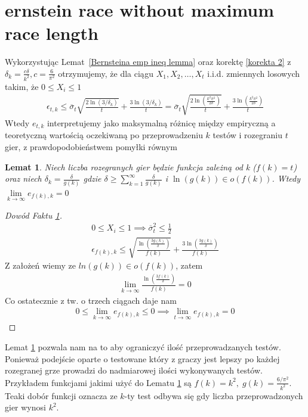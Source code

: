 \documentclass[inzynierska]{pwr_wmat_praca_dyplomowa}
\theoremstyle{plain}
\numberwithin{theorem}{chapter}
\newtheorem{lemma}[theorem]{Lemat}
\theoremstyle{definition}
\numberwithin{theorem}{chapter}
\begin{document}
	\section{ernstein race without maximum race length}
	Wykorzystując Lemat~\ref{Bernsteina emp ineq lemma} oraz korektę \ref{korekta 2} z $\delta_k=\frac{c\delta}{k^2}, c=\frac{6}{\pi^2}$ otrzymujemy, że dla ciągu $X_1,X_2,\dots,X_t$ i.i.d. zmiennych losowych takim, że  $0 \le X_i \le 1$ 
	\begin{align*}
		\label{Bernstein race without maximum race length}
		\epsilon_{t,k} \le \overline{\sigma}_t \sqrt{\frac{2\ln(3/\delta_k)}{t}} + \frac{3  \ln{(3 / \delta_k)}}{t} =
		\overline{\sigma}_t\sqrt{\frac{2\ln(\frac{k^2\pi^2}{2\delta})}{t}} + \frac{3  \ln{(\frac{k^2\pi^2}{2\delta})}}{t}
	\end{align*}
	Wtedy $e_{t,k}$ interpretujemy jako maksymalną różnicę między empiryczną a teoretyczną wartością oczekiwaną po przeprowadzeniu $k$ testów i rozegraniu $t$ gier, z prawdopodobieństwem pomyłki równym 
	\begin{lemma}
		\label{lemma Bernstein race without maximum race length}
		Niech liczba rozegranych gier będzie funkcja zależną od k ($f(k) = t$) oraz niech $\delta_k = \frac{\delta}{g(k)}$
		gdzie $\delta \ge \sum_{k=1}^{\infty} \frac{\delta}{g(k)}$ i $\ln(g(k)) \in o(f(k))$. Wtedy
		$\lim\limits_{k\to\infty} e_{f(k),k} = 0$ 
	\end{lemma}
	\begin{proof}[Dowód Faktu \ref{lemma Bernstein race without maximum race length}]
		\begin{gather*}
			0\le X_i \le 1 \implies \overline{\sigma}_t^2 \le \frac{1}{2}\\
			\epsilon_{f(k), k} \le  \sqrt{\frac{\ln(\frac{3g(k)}{\delta})}{f(k)}} + \frac{3  \ln{(\frac{3g(k)}{\delta})}}{f(k)}
		\end{gather*}
		Z założeń wiemy ze $ln(g(k)) \in o(f(k))$, zatem
		\begin{gather*}
			\lim\limits_{k\to\infty} \frac{  \ln{(\frac{3f(k)}{\delta})}}{f(k)} = 0
		\end{gather*}
		Co ostatecznie z tw. o trzech ciągach daje nam
		\begin{gather*}
			0\le \lim\limits_{k\to\infty} e_{f(k), k} \le 0 \implies \lim\limits_{t\to\infty} e_{f(k), k} = 0
		\end{gather*}
	\end{proof}
	Lemat \ref{lemma Bernstein race without maximum race length} pozwala nam na to aby ograniczyć ilość przeprowadzanych testów. Ponieważ podejście oparte o testowane który z graczy jest lepszy po każdej rozegranej grze prowadzi do nadmiarowej ilości wykonywanych testów.
	Przykładem funkcjami jakimi użyć do Lematu \ref{lemma Bernstein race without maximum race length} są $f(k) = k^2,\; g(k) = \frac{6/\pi^2}{k^2}$. Teaki dobór funkcji oznacza ze $k$-ty test odbywa się gdy liczba przeprowadzonych gier wynosi $k^2$.
	
\end{document}
